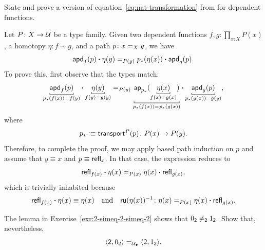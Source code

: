\begin{exr}
    State and prove a version of equation~{\upshape\eqref{eq:nat-transformation}} from {\upshape{}} for dependent functions.
\end{exr}

\begin{solution}
    Let\/ $P\colon X\to\univ$ be a type family. Given two dependent functions\/ $f,g\colon\prod_{x\colon X}P(x)$, a homotopy\/ $\eta\colon f\sim g$, and a path\/ $p\colon x\eq{X}y$, we have
    \[
       \mathsf{apd}_f(p)\mathbin{\boldsymbol{\cdot}}\eta(y)\mathrel{=_{P(y)}}p_*(\eta(x))\mathbin{\boldsymbol{\cdot}}\mathsf{apd}_g(p).
    \]
    To prove this, first observe that the types match:
    \[
       \explain[p_*(f(x))\eq{}f(y)]{\fun{apd}_f(p)}
       \ct
       \explain[f(y)\eq{}g(y)]{\eta(y)}
       \eq{P(y)}
       \explain[p_*(f(x))\eq{}p_*(g(x))]
       {{\fun{ap}_{p_*}(\explain[f(x)\eq{}g(x)]{\eta(x)})}}
       \ct
       \explain[p_*(g(x))\eq{}g(y)]{\fun{apd}_g(p)},
    \]
    where
    \[
        p_*\defeq\fun{transport}^P(p)\colon P(x)\to P(y).
    \]
    Therefore, to complete the proof, we may apply based path induction on\/ $p$ and assume that\/ $y\equiv x$ and\/ $p\equiv\mathsf{refl}_x$. In that case, the expression reduces to
    \[
        \mathsf{refl}_{f(x)}\mathbin{\boldsymbol{\cdot}}\eta(x)
            \mathrel{=_{P(x)}}\eta(x)\mathbin{\boldsymbol{\cdot}}\mathsf{refl}_{g(x)},
    \]
    which is trivially inhabited because
    \[
        \fun{refl}_{f(x)}\ct\eta(x)\equiv\eta(x)
        \quad\text{and}\quad
        \fun{ru}(\eta(x))^{-1}\colon\eta(x)
            \eq{P(x)}\eta(x)\ct\fun{refl}_{g(x)}.
    \]
\end{solution}

\begin{exr}\ua
    The lemma in {\upshape Exercise~\ref{exr:2-simeq-2-simeq-2}} shows that $0_{\mathsf{2}}\ne_{\mathsf{2}}1_{\mathsf{2}}$. Show that, nevertheless, 
    \[
        \dep{\fun2,0_{\fun2}}
        \eq\puniv
        \dep{\fun2,1_{\fun2}}.
    \]
\end{exr}

